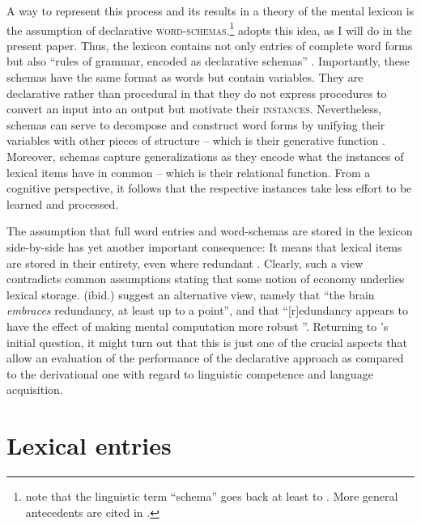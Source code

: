 \documentclass[output=paper,colorlinks,citecolor=brown]{langscibook}
\begin{document}
A way to represent this process and its results in a theory of the mental lexicon is the assumption of declarative \textsc{word-schemas}.\footnote{\citet[471]{Jackendoff.Audring2016} note that the linguistic term ``schema'' goes back at least to \citet{Bybee.Slobin1982}. More general antecedents are cited in \citet{Rumelhart1980}.} \citet{Zimmermann2019} adopts this idea, as I will do in the present paper. Thus, the lexicon contains not only entries of complete word forms but also ``rules of grammar, encoded as declarative schemas'' \citep[467]{Jackendoff.Audring2016}. Importantly, these schemas have the same format as words but contain variables. They are declarative rather than procedural in that they do not express procedures to convert an input into an output but motivate their \textsc{instances}. Nevertheless, schemas can serve to decompose and construct word forms by unifying their variables with other pieces of structure -- which is their generative function \citep[472]{Jackendoff.Audring2016}. Moreover, schemas capture generalizations as they encode what the instances of lexical items have in common -- which is their relational function. From a cognitive perspective, it follows that the respective instances take less effort to be learned and processed.

The assumption that full word entries and word-schemas are stored in the lexicon side-by-side has yet another important consequence: It means that lexical items are stored in their entirety, even where redundant \parencite[see][476]{Jackendoff.Audring2016}. Clearly, such a view contradicts common assumptions stating that some notion of economy underlies lexical storage. \citeauthor{Jackendoff.Audring2016} (ibid.) suggest an alternative view, namely that ``the brain \textit{embraces} redundancy, at least up to a point'', and that ``[r]edundancy appears to have the effect of making mental computation more robust \citep[6]{Libben2007}''. Returning to \citeauthor{Zimmermann2019}'s initial question, it might turn out that this is just one of the crucial aspects that allow an evaluation of the performance of the declarative approach as compared to the derivational one with regard to linguistic competence and language acquisition.


\section{Lexical entries}\label{sec:LexEntries}
\end{document}

